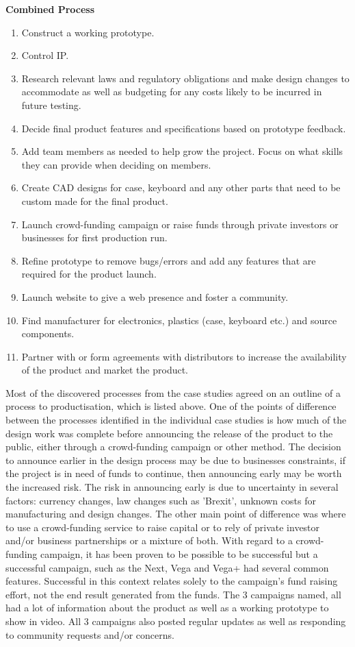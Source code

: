 \textbf{Combined Process}
\begin{enumerate}
\item Construct a working prototype.
\item Control IP.
\item Research relevant laws and regulatory obligations and make design changes to accommodate as well as budgeting for any costs likely to be incurred in future testing.
\item Decide final product features and specifications based on prototype feedback.
\item Add team members as needed to help grow the project. Focus on what skills they can provide when deciding on members.
\item Create CAD designs for case, keyboard and any other parts that need to be custom made for the final product.
\item Launch crowd-funding campaign or raise funds through private investors or businesses for first production run.
\item Refine prototype to remove bugs/errors and add any features that are required for the product launch.
\item Launch website to give a web presence and foster a community.
\item Find manufacturer for electronics, plastics (case, keyboard etc.) and source components.
\item Partner with or form agreements with distributors to increase the availability of the product and market the product.
\end{enumerate} 

Most of the discovered processes from the case studies agreed on an outline of a process to productisation, which is listed above. One of the points of difference between the processes identified in the individual case studies is how much of the design work was complete before announcing the release of the product to the public, either through a crowd-funding campaign or other method. The decision to announce earlier in the design process may be due to businesses constraints, if the project is in need of funds to continue, then announcing early may be worth the increased risk. The risk in announcing early is due to uncertainty in several factors: currency changes, law changes such as 'Brexit', unknown costs for manufacturing and design changes. The other main point of difference was where to use a crowd-funding service to raise capital or to rely of private investor and/or business partnerships or a mixture of both. With regard to a crowd-funding campaign, it has been proven to be possible to be successful but a successful campaign, such as the Next, Vega and Vega+ had several common features. Successful in this context relates solely to the campaign's fund raising effort, not the end result generated from the funds. The 3 campaigns named, all had a lot of information about the product as well as a working prototype to show in video. All 3 campaigns also posted regular updates as well as responding to community requests and/or concerns.

